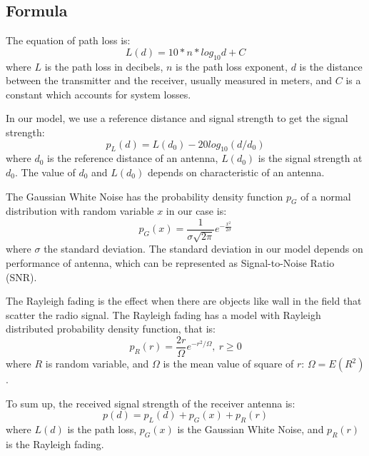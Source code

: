 \subsection{Formula}
The equation of path loss is:
\begin{equation}
L(d)=10*n*log_{10}d + C
\end{equation}
where $L$ is the path loss in decibels, $n$ is the path loss exponent, $d$ is the distance between the transmitter and the receiver, usually measured in meters, and $C$ is a constant which accounts for system losses.
\par
In our model, we use a reference distance and signal strength to get the signal strength:
\begin{equation}
p_{L}(d)=L(d_{0})-20log_{10}(d/d_{0})
\end{equation}
where $d_{0}$ is the reference distance of an antenna, $L(d_{0})$ is the signal strength at $d_{0}$. The value of $d_{0}$ and $L(d_{0})$ depends on characteristic of an antenna.
\\
\vspace{1cm}

The Gaussian White Noise has the probability density function $p_{G}$ of a normal distribution with random variable $x$ in our case is:
\begin{equation}
p_{G}(x)={\frac {1}{ {\sigma\sqrt {2\pi }}}}e^{-{\frac {x^{2}}{2\sigma}}}
\end{equation}
where $\sigma$  the standard deviation. The standard deviation in our model depends on performance of antenna, which can be represented as Signal-to-Noise Ratio (SNR).
\vspace{1cm}

The Rayleigh fading is the effect when there are objects like wall in the field that scatter the radio signal. The Rayleigh fading has a model with Rayleigh distributed probability density function, that is:
\begin{equation}
p_{R}(r)={\frac {2r}{\Omega }}e^{-r^{2}/\Omega },\ r\geq {}0
\end{equation}
where $R$ is random variable, and $\Omega$ is the mean value of square of $r$: $\Omega = E(R^{2})$.
\vspace{1cm}

To sum up, the received signal strength of the receiver antenna is:
\begin{equation}
p(d)=p_{L}(d)+p_{G}(x)+p_{R}(r)
\end{equation}
where $L(d)$ is the path loss, $p_{G}(x)$ is the Gaussian White Noise, and $p_{R}(r)$ is the Rayleigh fading.
\vspace{1cm}


